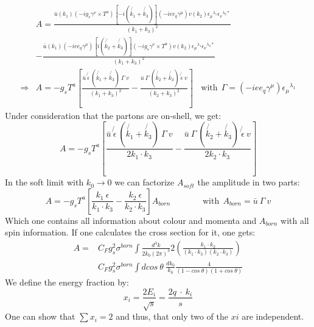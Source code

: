 \begin{equation}
\begin{split}
&A= \frac{\bar{u}(k_1)(-ig_s\gamma^{\nu}\times T^a)[-i(\not{k_1}+\not{k_3})](-iee_q \gamma^{\mu})v(k_2){\epsilon_{\mu}}^{\lambda_1}{\epsilon_{\nu}}^{\lambda_2*}}{(k_1 + k_3)^2}\\ 
&- \frac{\bar{u}(k_1)(-iee_q \gamma^{\mu})[i(\not{k_2}+\not{k_3})](-ig_s\gamma^{\nu}\times T^a)v(k_2){\epsilon_{\mu}}^{\lambda_1}{\epsilon_{\nu}}^{\lambda_2*}}{(k_1 + k_3)^2}\\
\Rightarrow &A=-g_s T^a[ \frac{\bar{u}\:\not{\epsilon}\:(\not{k_1}+\not{k_3})\:\Gamma \:v}{(k_1 + k_3)^2} - \frac{\bar{u}\:\Gamma\:(\not{k_2}+\not{k_3})\:\not{\epsilon} \:v}{(k_2 + k_3)^2}] \:\:\:\:\text{with} \:\:\Gamma=(-iee_q \gamma^{\mu}){\epsilon_{\mu}}^{\lambda_1}
\end{split}
\end{equation}
Under consideration that the partons are on-shell, we get:
\begin{equation}
 A=-g_s T^a[ \frac{\bar{u}\:\not{\epsilon}\:(\not{k_1}+\not{k_3})\:\Gamma \:v}{2k_1 \cdot k_3} - \frac{\bar{u}\:\Gamma\:(\not{k_2}+\not{k_3})\:\not{\epsilon} \:v}{2k_2 \cdot k_3}]
\end{equation}
In the soft limit with $k_0 \rightarrow 0$ we can factorize $ A_{soft} $ the amplitude in two parts:
\begin{equation}
 A=-g_s T^a[ \frac{k_1\:{\epsilon}}{k_1 \cdot k_3} - \frac{k_2\:{\epsilon}}{k_2 \cdot k_3}] A_{born} \:\:\:\:\:\:\:\:\:\:\:\:\:\:\:\:\:\text{with}\:\: A_{born}= \bar{u}\: \Gamma \:v
\end{equation}
 Which one contains all information about colour and momenta and $ A_{born} $ with all spin information.
If one calculates the cross section for it, one gets:
\begin{equation}
\begin{split}
A=&C_F g_s^2 \sigma^{born} \int \frac{d^3 k}{2k_0 (2{\pi})^3} 2(\frac{k_1 \cdot k_2}{(k_1 \cdot k_3)(k_2 \cdot k_3)})\\ 
&C_F g_s^2 \sigma^{born} \int dcos\: \theta\: \frac{d k_0}{k_0} \frac{4}{(1-cos\: \theta)(1+cos\: \theta)}
\end{split}
\end{equation}
We define the energy fraction by:
\begin{equation}
x_i = \frac{2E_i}{\sqrt{s}}=\frac{2q\: \cdot\: k_i}{s}
\end{equation}
One can show that $ \sum x_i =2  $ and thus, that only two of the $ xi $ are independent.

